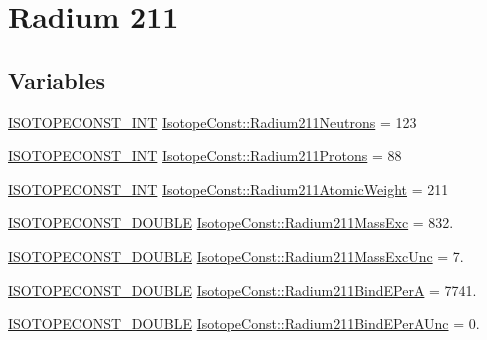 \hypertarget{group___isotope_const-_radium-_ra211}{}\section{Radium 211}
\label{group___isotope_const-_radium-_ra211}
\subsection*{Variables}
\begin{DoxyCompactItemize}
\item 
\mbox{\hyperlink{group___isotope_const-_macros_ga5f18360b3e99483a35c32d789e62621c}{I\+S\+O\+T\+O\+P\+E\+C\+O\+N\+S\+T\+\_\+\+I\+NT}} \mbox{\hyperlink{group___isotope_const-_radium-_ra211_ga785d6e6446ae568752131903127a4266}{Isotope\+Const\+::\+Radium211\+Neutrons}} = 123
\item 
\mbox{\hyperlink{group___isotope_const-_macros_ga5f18360b3e99483a35c32d789e62621c}{I\+S\+O\+T\+O\+P\+E\+C\+O\+N\+S\+T\+\_\+\+I\+NT}} \mbox{\hyperlink{group___isotope_const-_radium-_ra211_gac317cc2a4ff94e73c3d11c2a4f6428ab}{Isotope\+Const\+::\+Radium211\+Protons}} = 88
\item 
\mbox{\hyperlink{group___isotope_const-_macros_ga5f18360b3e99483a35c32d789e62621c}{I\+S\+O\+T\+O\+P\+E\+C\+O\+N\+S\+T\+\_\+\+I\+NT}} \mbox{\hyperlink{group___isotope_const-_radium-_ra211_gaf69ad2edf26f86c77a3a8443d9a23602}{Isotope\+Const\+::\+Radium211\+Atomic\+Weight}} = 211
\item 
\mbox{\hyperlink{group___isotope_const-_macros_ga8f45a7272ce02c0b4c65c44636ed719a}{I\+S\+O\+T\+O\+P\+E\+C\+O\+N\+S\+T\+\_\+\+D\+O\+U\+B\+LE}} \mbox{\hyperlink{group___isotope_const-_radium-_ra211_gaf864cc6da88cfbae21b53c4ac7613e82}{Isotope\+Const\+::\+Radium211\+Mass\+Exc}} = 832.
\item 
\mbox{\hyperlink{group___isotope_const-_macros_ga8f45a7272ce02c0b4c65c44636ed719a}{I\+S\+O\+T\+O\+P\+E\+C\+O\+N\+S\+T\+\_\+\+D\+O\+U\+B\+LE}} \mbox{\hyperlink{group___isotope_const-_radium-_ra211_gaeb0b0fc3628d0094a5e9ee76283b1c30}{Isotope\+Const\+::\+Radium211\+Mass\+Exc\+Unc}} = 7.
\item 
\mbox{\hyperlink{group___isotope_const-_macros_ga8f45a7272ce02c0b4c65c44636ed719a}{I\+S\+O\+T\+O\+P\+E\+C\+O\+N\+S\+T\+\_\+\+D\+O\+U\+B\+LE}} \mbox{\hyperlink{group___isotope_const-_radium-_ra211_ga740674cd444d1b201491eac49686b840}{Isotope\+Const\+::\+Radium211\+Bind\+E\+PerA}} = 7741.
\item 
\mbox{\hyperlink{group___isotope_const-_macros_ga8f45a7272ce02c0b4c65c44636ed719a}{I\+S\+O\+T\+O\+P\+E\+C\+O\+N\+S\+T\+\_\+\+D\+O\+U\+B\+LE}} \mbox{\hyperlink{group___isotope_const-_radium-_ra211_ga73b6bc905a723acc2d67cc13a0b02622}{Isotope\+Const\+::\+Radium211\+Bind\+E\+Per\+A\+Unc}} = 0.

\end{DoxyCompactItemize}
